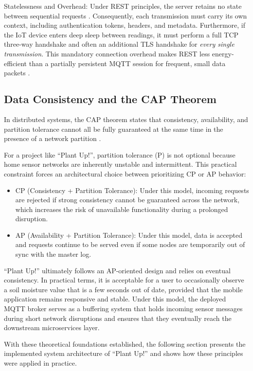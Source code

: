 Statelessness and Overhead:
Under REST principles, the server retains no state between sequential requests \cite{fieldingRest2000}. Consequently, each transmission must carry its own context, including authentication tokens, headers, and metadata. Furthermore, if the IoT device enters deep sleep between readings, it must perform a full TCP three-way handshake and often an additional TLS handshake for \textit{every single transmission}. This mandatory connection overhead makes REST less energy-efficient than a partially persistent MQTT session for frequent, small data packets \cite{rfc8446Tls, chenKunz2016IotProtocols, jara2023mqtt}.

\subsection{Data Consistency and the CAP Theorem}
In distributed systems, the CAP theorem states that consistency, availability, and partition tolerance cannot all be fully guaranteed at the same time in the presence of a network partition \cite{gilbertLynchCap2002}.

For a project like ``Plant Up!'', partition tolerance (P) is not optional because home sensor networks are inherently unstable and intermittent. This practical constraint forces an architectural choice between prioritizing CP or AP behavior:
\begin{itemize}
    \item CP (Consistency + Partition Tolerance): Under this model, incoming requests are rejected if strong consistency cannot be guaranteed across the network, which increases the risk of unavailable functionality during a prolonged disruption.
    \item AP (Availability + Partition Tolerance): Under this model, data is accepted and requests continue to be served even if some nodes are temporarily out of sync with the master log.
\end{itemize}

``Plant Up!'' ultimately follows an AP-oriented design and relies on eventual consistency. In practical terms, it is acceptable for a user to occasionally observe a soil moisture value that is a few seconds out of date, provided that the mobile application remains responsive and stable. Under this model, the deployed MQTT broker serves as a buffering system that holds incoming sensor messages during short network disruptions and ensures that they eventually reach the downstream microservices layer.

With these theoretical foundations established, the following section presents the implemented system architecture of ``Plant Up!'' and shows how these principles were applied in practice.
